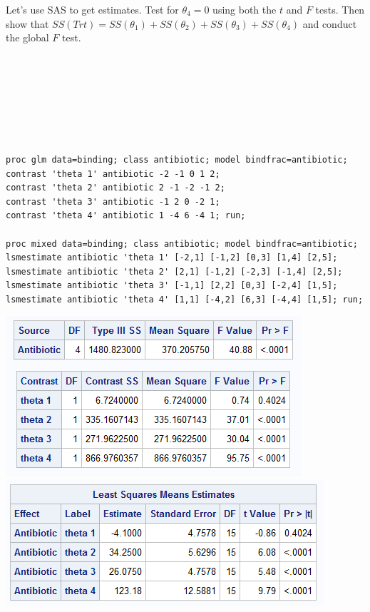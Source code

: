Let's use SAS to get estimates.  Test for $\theta_4=0$ using both the $t$ and $F$ tests.  Then show that $SS(Trt)=SS(\theta_1)+SS(\theta_2)+SS(\theta_3)+SS(\theta_4)$ and conduct the global $F$ test.\\~\\~\\~\\~\\~\\~\\~\\
\begin{small}
\begin{verbatim}
proc glm data=binding; class antibiotic; model bindfrac=antibiotic;
contrast 'theta 1' antibiotic -2 -1 0 1 2;
contrast 'theta 2' antibiotic 2 -1 -2 -1 2;
contrast 'theta 3' antibiotic -1 2 0 -2 1;
contrast 'theta 4' antibiotic 1 -4 6 -4 1; run;

proc mixed data=binding; class antibiotic; model bindfrac=antibiotic;
lsmestimate antibiotic 'theta 1' [-2,1] [-1,2] [0,3] [1,4] [2,5]; 
lsmestimate antibiotic 'theta 2' [2,1] [-1,2] [-2,3] [-1,4] [2,5]; 
lsmestimate antibiotic 'theta 3' [-1,1] [2,2] [0,3] [-2,4] [1,5]; 
lsmestimate antibiotic 'theta 4' [1,1] [-4,2] [6,3] [-4,4] [1,5]; run;
\end{verbatim}
\end{small}

\begin{center}
\includegraphics[scale=0.75]{BindFracContrastSS}\includegraphics[scale=0.7]{BindFracContrastMixed}
\end{center}

